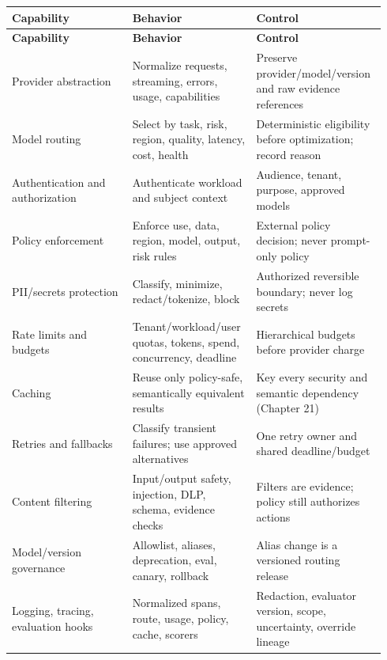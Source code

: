 \BookTableStart
\small
\begin{longtable}{@{}Y{0.3133\linewidth}Y{0.3133\linewidth}Y{0.3133\linewidth}@{}}
\color{white}\bfseries \textbf{Capability} & \color{white}\bfseries \textbf{Behavior} & \color{white}\bfseries \textbf{Control} \\
\endfirsthead
{}
\color{white}\bfseries \textbf{Capability} & \color{white}\bfseries \textbf{Behavior} & \color{white}\bfseries \textbf{Control} \\
\endhead
Provider abstraction & Normalize requests, streaming, errors, usage, capabilities & Preserve provider/model/version and raw evidence references \\
Model routing & Select by task, risk, region, quality, latency, cost, health & Deterministic eligibility before optimization; record reason \\
Authentication and authorization & Authenticate workload and subject context & Audience, tenant, purpose, approved models \\
Policy enforcement & Enforce use, data, region, model, output, risk rules & External policy decision; never prompt-only policy \\
PII/secrets protection & Classify, minimize, redact/tokenize, block & Authorized reversible boundary; never log secrets \\
Rate limits and budgets & Tenant/workload/user quotas, tokens, spend, concurrency, deadline & Hierarchical budgets before provider charge \\
Caching & Reuse only policy-safe, semantically equivalent results & Key every security and semantic dependency (Chapter 21) \\
Retries and fallbacks & Classify transient failures; use approved alternatives & One retry owner and shared deadline/budget \\
Content filtering & Input/output safety, injection, DLP, schema, evidence checks & Filters are evidence; policy still authorizes actions \\
Model/version governance & Allowlist, aliases, deprecation, eval, canary, rollback & Alias change is a versioned routing release \\
Logging, tracing, evaluation hooks & Normalized spans, route, usage, policy, cache, scorers & Redaction, evaluator version, scope, uncertainty, override lineage \\
\end{longtable}
\BookTableEnd

